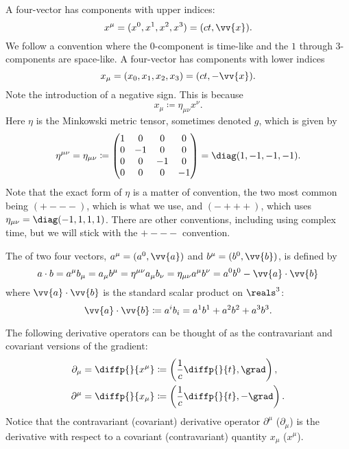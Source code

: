 \documentclass[fleqn]{NotesClass}
\begin{document}
    A  four-vector has components with upper indices:
    \begin{equation}
        x^\mu = (x^0, x^1, x^2, x^3) = (ct, \vv{x}).
    \end{equation}
    We follow a convention where the \(0\)-component is time-like and the \(1\) through \(3\)-components are space-like.
    A  four-vector has components with lower indices
    \begin{equation}
        x_\mu = (x_0, x_1, x_2, x_3) = (ct, -\vv{x}).
    \end{equation}
    Note the introduction of a negative sign.
    This is because
    \begin{equation}
        x_\mu \coloneqq \eta_{\mu\nu}x^{\nu}.
    \end{equation}
    Here \(\eta\) is the Minkowski metric tensor, sometimes denoted \(g\), which is given by
    \begin{equation}
        \eta^{\mu\nu} = \eta_{\mu\nu} \coloneqq
        \begin{pmatrix}
            1 & 0 & 0 & 0\\
            0 & -1 & 0 & 0\\
            0 & 0 & -1 & 0\\
            0 & 0 & 0 & -1
        \end{pmatrix}
        = \diag(1, -1, -1, -1).
    \end{equation}
    Note that the exact form of \(\eta\) is a matter of convention, the two most common being \((+---)\), which is what we use, and \((-+++)\), which uses \(\eta_{\mu\nu} = \diag(-1,1,1,1)\).
    There are other conventions, including using complex time, but we will stick with the \(+---\) convention.
    
    The  of two four vectors, \(a^\mu = (a^0, \vv{a})\) and \(b^\mu = (b^0, \vv{b})\), is defined by
    \begin{equation}
        a \cdot b = a^\mu b_\mu = a_\mu b^\mu = \eta^{\mu\nu}a_\mu b_\nu = \eta_{\mu\nu}a^\mu b^\nu = a^0b^0 - \vv{a} \cdot \vv{b}
    \end{equation}
    where \(\vv{a} \cdot \vv{b}\) is the standard scalar product on \(\reals^3\):
    \begin{equation}
        \vv{a} \cdot \vv{b} \coloneqq a^ib_i = a^1b^1 + a^2b^2 + a^3b^3.
    \end{equation}
    
    The following derivative operators can be thought of as the contravariant and covariant versions of the gradient:
    \begin{align}
        \partial_\mu &= \diffp{}{x^\mu} \coloneqq \left( \frac{1}{c}\diffp{}{t}, \grad \right),\\
        \partial^\mu &= \diffp{}{x_\mu} \coloneqq \left( \frac{1}{c}\diffp{}{t}, -\grad \right).
    \end{align}
    Notice that the contravariant (covariant) derivative operator \(\partial^\mu\) (\(\partial_\mu\)) is the derivative with respect to a covariant (contravariant) quantity \(x_\mu\) (\(x^\mu\)).
    
\end{document}
